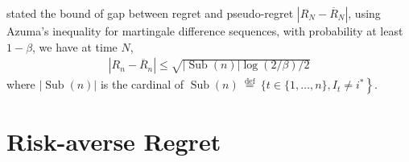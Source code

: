 \documentclass{article}
\begin{document}
\textcite{coquelin2007bandit} stated the bound of gap between regret and pseudo-regret $|R_N - \overline{R}_N|$, using Azuma’s inequality for martingale difference sequences, with probability
at least $1 - \beta$, we have at time $N$,
\begin{align}
    \left|R_{n}-\overline{R}_{n}\right| \leq \sqrt{|\operatorname{Sub}(n)| \log (2 / \beta) / 2}
\end{align}
where $|\operatorname{Sub}(n)|$ is the cardinal of $\operatorname{Sub}(n) \stackrel{\text { def }}{=}\{t \in \left.\{1, \ldots, n\}, I_{t} \neq i^{*}\right\}$.

\section{Risk-averse Regret}
\end{document}
